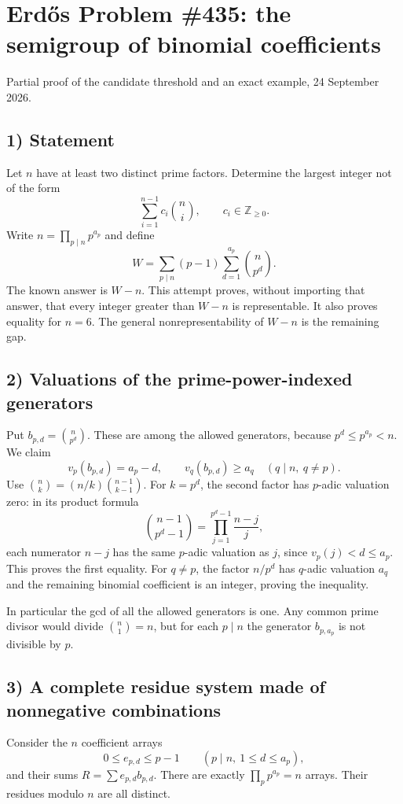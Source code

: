 \section{Erd\H{o}s Problem \#435: the semigroup of binomial coefficients}
\noindent Partial proof of the candidate threshold and an exact example, 24 September 2026.

\subsection*{1) Statement}
Let $n$ have at least two distinct prime factors. Determine the largest integer not of the form
\[\sum_{i=1}^{n-1}c_i\binom ni,\qquad c_i\in\mathbb Z_{\ge0}.
\]
Write $n=\prod_{p\mid n}p^{a_p}$ and define
\[W=\sum_{p\mid n}(p-1)\sum_{d=1}^{a_p}\binom n{p^d}.
\]
The known answer is $W-n$. This attempt proves, without importing that answer, that every integer greater than $W-n$ is representable. It also proves equality for $n=6$. The general nonrepresentability of $W-n$ is the remaining gap.

\subsection*{2) Valuations of the prime-power-indexed generators}
Put $b_{p,d}=\binom n{p^d}$. These are among the allowed generators, because $p^d\le p^{a_p}<n$. We claim
\[v_p(b_{p,d})=a_p-d,\qquad v_q(b_{p,d})\ge a_q\quad(q\mid n,\ q\ne p).\tag{1}\]
Use $\binom nk=(n/k)\binom{n-1}{k-1}$. For $k=p^d$, the second factor has $p$-adic valuation zero: in its product formula
\[\binom{n-1}{p^d-1}=\prod_{j=1}^{p^d-1}\frac{n-j}{j},
\]
each numerator $n-j$ has the same $p$-adic valuation as $j$, since $v_p(j)<d\le a_p$. This proves the first equality. For $q\ne p$, the factor $n/p^d$ has $q$-adic valuation $a_q$ and the remaining binomial coefficient is an integer, proving the inequality.

In particular the gcd of all the allowed generators is one. Any common prime divisor would divide $\binom n1=n$, but for each $p\mid n$ the generator $b_{p,a_p}$ is not divisible by $p$.

\subsection*{3) A complete residue system made of nonnegative combinations}
Consider the $n$ coefficient arrays
\[0\le e_{p,d}\le p-1\qquad(p\mid n,\ 1\le d\le a_p),
\]
and their sums $R=\sum e_{p,d}b_{p,d}$. There are exactly $\prod_p p^{a_p}=n$ arrays. Their residues modulo $n$ are all distinct.


